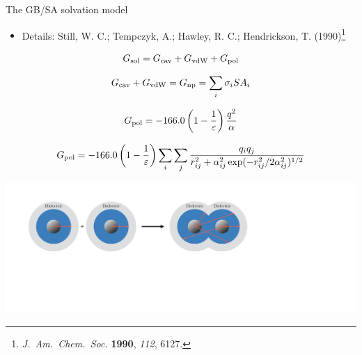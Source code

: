 \documentclass[10pt]{beamer}
\begin{document}

\begin{frame}[t]{The GB/SA solvation model}

\begin{itemize}
    \item Details: Still, W. C.; Tempczyk, A.; Hawley, R. C.; Hendrickson, T. (1990)\footnote{\textit{J.\ Am.\ Chem.\ Soc.} \textbf{1990}, \textit{112}, 6127.}
\end{itemize}
%
\begin{equation*}
G_\textnormal{sol} = G_\textnormal{cav} + G_\textnormal{vdW} + G_\textnormal{pol}  
\end{equation*}

\begin{equation*}
G_\textnormal{cav} + G_\textnormal{vdW} = G_\textnormal{np} = \sum_i\sigma_i SA_i
\end{equation*}

\begin{equation*}
G_\textnormal{pol} = -166.0\left(1-\frac{1}{\varepsilon}\right)\frac{q^2}{\alpha}
\end{equation*}

\begin{equation*}
G_\textnormal{pol} = -166.0\left(1-\frac{1}{\varepsilon}\right)\sum_i\sum_j\frac{q_iq_j}{r^2_{ij}+\alpha^2_{ij}\exp(-r^2_{ij}/2\alpha^2_{ij})^{1/2}}
\end{equation*}

\begin{center}
\includegraphics[scale=0.179]{figures/pdf/bornradius.pdf}
\end{center}
\end{frame}

\end{document}
